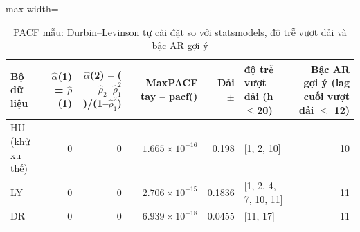 \begin{table}[H]
\centering\small
\caption{PACF mẫu: Durbin–Levinson tự cài đặt so với statsmodels, độ trễ vượt dải và bậc AR gợi ý}\label{tab:tab_b11_11_pacf}
\begin{adjustbox}{max width=\linewidth}
\begin{tabular}{lrrrrlr}
\toprule
Bộ dữ liệu & $\hat{\alpha}$(1) = $\hat{\rho}$(1) & $\hat{\alpha}$(2) – ($\hat{\rho}_{2}$–$\hat{\rho}_{1}^{2}$)/(1–$\hat{\rho}_{1}^{2}$) & Max\textbar{}PACF tay – pacf()\textbar{} & Dải $\pm$ & độ trễ vượt dải (h$\le$20) & Bậc AR gợi ý (lag cuối vượt dải $\le$ 12) \\
\midrule
HU (khử xu thế) & 0 & 0 & $1.665\times10^{-16}$ & 0.198 & [1, 2, 10] & 10 \\
LY & 0 & 0 & $2.706\times10^{-15}$ & 0.1836 & [1, 2, 4, 7, 10, 11] & 11 \\
DR & 0 & 0 & $6.939\times10^{-18}$ & 0.0455 & [11, 17] & 11 \\
\bottomrule
\end{tabular}
\end{adjustbox}
\end{table}
